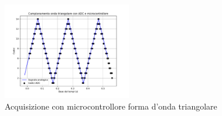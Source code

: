 \documentclass[journal]{IEEEtran}
\begin{document}
\begin{figure}[H]%
\begin{center}
\includegraphics[trim = {0 25 0 0},clip, width=0.50\textwidth]{analysis/output/mcu_triangle.pdf}
\caption{Acquisizione con microcontrollore forma d'onda triangolare}
\label{fig:mcu_triang}
\end{center}
\end{figure}



\end{document}

